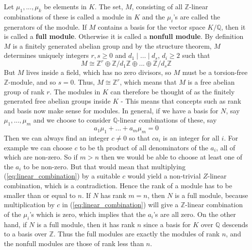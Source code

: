 \documentclass{article}
\newtheorem{definition}{Definition}[section]
\newcommand{\mbb}[1]{\mathbb{#1}}
\begin{document}
Let $\mu_1, ..., \mu_k$ be elements in $K$. The set, $M$, consisting of all $\mbb{Z}$-linear combinations of these is called a module in $K$ and the $\mu_i$'s are called the generators of the module. If $M$ contains a basis for the vector space $K / \mbb{Q}$, then it is called a \textbf{full module}. Otherwise it is called a \textbf{nonfull module}. By definition $M$ is a finitely generated abelian group and by the structure theorem, $M$ determines uniquely integers $r,s \geq 0$ and $d_1 \mid ... \mid d_s$, $d_i \geq 2$ such that
$$M \cong \mbb{Z}^r \oplus \mbb{Z}/d_1\mbb{Z} \oplus ... \oplus \mbb{Z}/d_s\mbb{Z} $$
But $M$ lives inside a field, which has no zero divisors, so $M$ must be a torsion-free $\mbb{Z}$-module, and so $s = 0$. Thus, $M \cong \mbb{Z}^r$, which means that $M$ is a free abelian group of rank $r$. The modules in $K$ can therefore be thought of as the finitely generated free abelian groups inside $K$ - This means that concepts such as rank and basis now make sense for modules. 
In general, if we have a basis for $N$, say $\mu_1, ..., \mu_m$ and we choose to consider $\mbb Q$-linear combinations of these, say 
\begin{equation}
    a_1 \mu_1 + ... + a_m \mu_m = 0 \label{eq:linear_combination}
\end{equation}
Then we can always find an integer $c \neq 0$ so that $c a_i$ is an integer for all $i$. For example we can choose $c$ to be th product of all denominators of the $a_i$, all of which are non-zero. So if $m > n$ then we would be able to choose at least one of the $a_i$ to be non-zero. But that would mean that multiplying (\ref*{eq:linear_combination}) by a suitable $c$ would yield a non-trivial $Z$-linear combination, which is a contradiction. Hence the rank of a module has to be smaller than or equal to $n$. If $N$ has rank $m = n$, then $N$ is a full module, because multiplication by $c$ in (\ref{eq:linear_combination}) will give a $\mbb Z$-linear combination of the $\mu_i$'s which is zero, which implies that the $a_i$'s are all zero. On the other hand, if $N$ is a full module, then it has rank $n$ since a basis for $K$ over $\mbb Q$ descends to a basis over $\mbb Z$. Thus the full modules are exactly the modules of rank $n$, and the nonfull modules are those of rank less than $n$.
\end{document}
